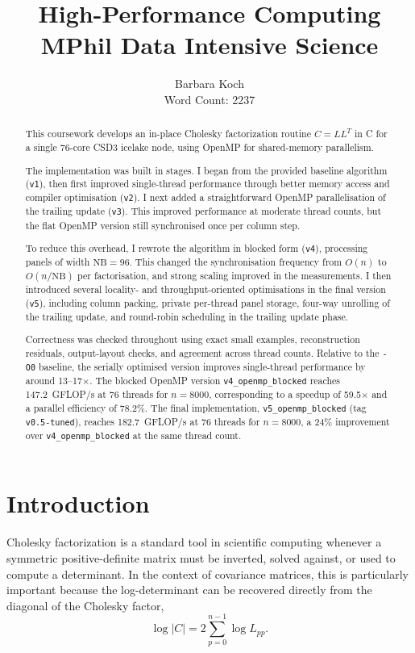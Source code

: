 \documentclass{article}
\title{High-Performance Computing\\
       \large MPhil Data Intensive Science}
\author{Barbara Koch \\ Word Count: 2237}
\begin{document}
\maketitle
\begin{abstract}
This coursework develops an in-place Cholesky factorization routine
\(C = LL^T\) in C for a single 76-core CSD3 icelake node, using OpenMP for
shared-memory parallelism.

The implementation was built in stages. I began from the provided baseline
algorithm (\texttt{v1}), then first improved single-thread performance through
better memory access and compiler optimisation (\texttt{v2}). I next added a
straightforward OpenMP parallelisation of the trailing update (\texttt{v3}).
This improved performance at moderate thread counts, but the flat OpenMP
version still synchronised once per column step.

To reduce this overhead, I rewrote the algorithm in blocked form
(\texttt{v4}), processing panels of width \(\mathrm{NB}=96\). This changed the
synchronisation frequency from \(O(n)\) to \(O(n/\mathrm{NB})\) per
factorisation, and strong scaling improved in the measurements. I then introduced
several locality- and throughput-oriented
optimisations in the final version (\texttt{v5}), including column packing,
private per-thread panel storage, four-way unrolling of the trailing update,
and round-robin scheduling in the trailing update phase.

Correctness was checked throughout using exact small examples, reconstruction
residuals, output-layout checks, and agreement across thread counts. Relative
to the \texttt{-O0} baseline, the serially optimised version improves
single-thread performance by around 13--17\(\times\). The blocked OpenMP
version \texttt{v4\_openmp\_blocked} reaches 147.2~GFLOP/s at 76 threads for
\(n=8000\), corresponding to a speedup of 59.5\(\times\) and a parallel
efficiency of 78.2\%. The final implementation,
\texttt{v5\_openmp\_blocked} (tag \texttt{v0.5-tuned}), reaches
182.7~GFLOP/s at 76 threads for \(n=8000\), a 24\% improvement over
\texttt{v4\_openmp\_blocked} at the same thread count.
\end{abstract}

\section{Introduction}

Cholesky factorization is a standard tool in scientific computing whenever a
symmetric positive-definite matrix must be inverted, solved against, or used to
compute a determinant. In the context of covariance matrices, this is
particularly important because the log-determinant can be recovered directly
from the diagonal of the Cholesky factor,
\begin{equation}
  \log |C| = 2 \sum_{p=0}^{n-1} \log L_{pp}.
\end{equation}
\end{document}
